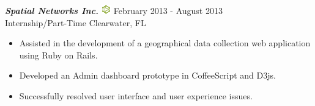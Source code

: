{\sl \textbf{Spatial Networks Inc.} \includegraphics[width=0.4cm]{./images/spatial-networks.jpg}} \hfill February 2013 - August 2013 \\
Internship/Part-Time \hfill Clearwater, FL
\begin{itemize}
    \item Assisted in the development of a geographical data collection web application using Ruby on Rails.
    \item Developed an Admin dashboard prototype in CoffeeScript and D3js.
    \item Successfully resolved user interface and user experience issues.
\end{itemize}
